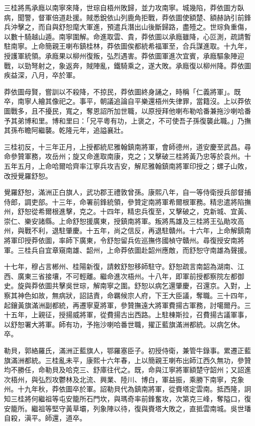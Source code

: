 \begin{pinyinscope}
三桂將馬承廕以南寧來降，世琮自梧州敗歸，並力攻南寧。城幾陷，莽依圖方臥病，聞警，督軍倍道赴援。賊悉銳依山列鹿角拒戰，莽依圖使額楚、額赫訥引前鋒兵沖擊之，而自與舒恕麾大軍進，預遣兵潛出山後斷歸路，盡殪之。世琮負重傷，以數十騎越山遁。南寧圍解。命進取雲、貴，莽依圖以承廕雖降，心叵測，疏請暫駐南寧。上命簡親王喇布鎮桂林，莽依圖俟都統希福軍至，合兵謀進取。十九年，授護軍統領。承廕果以柳州復叛，弘烈遇害。莽依圖軍進次宜賓，承廕驅象陣迎戰，以勁弩射之，象返奔，賊陣亂，鐵騎乘之，遂大敗。承廕復以柳州降。莽依圖疾益深，八月，卒於軍。

莽依圖母賢，嘗訓以不殺降，不掠民，莽依圖終身誦之，時稱「仁義將軍」。既卒，南寧人繪其像祀之。事平，朝議追論自平樂還梧州失律罪，當籍沒。上以莽依圖戰多，且不擾民，寬之，奪恩詔所加世職，以原授拜他喇布勒哈番兼拖沙喇哈番予其弟博和里。博和里曰：「兄平粵有功，上褒之，不可使吾子孫復襲此職。」乃撫其孫布瞻阿繼襲。乾隆元年，追謚襄壯。

三桂初反，十三年正月，上授都統尼雅翰鎮南將軍，會師德州，道安慶至武昌。尋命參贊軍務，攻岳州；旋又命進取南康，克之；又擊破三桂將黃乃忠等於袁州。十五年五月，上命哈爾哈齊率江寧兵攻吉安，解尼雅翰鎮南將軍印授之；螺子山敗，改授覺羅舒恕。

覺羅舒恕，滿洲正白旗人，武功郡王禮敦曾孫。康熙八年，自一等侍衛授兵部督捕侍郎，調吏部。十三年，命署前鋒統領，參贊定南將軍希爾根軍務。精忠遣將陷撫州，舒恕從希爾根進擊，克之。十四年，精忠兵復至，又擊破之，克新城、宜黃、崇仁、樂安諸縣。上命舒恕援廣東，授鎮南將軍。叛將馬雄及三桂將王弘勛攻高州，與戰不利，退駐肇慶。十五年，尚之信反，再退駐贛州。十六年，上命解鎮南將軍印授莽依圖，率師下廣東，令舒恕留兵佐巡撫佟國楨守贛州。尋復授安南將軍。三桂兵自宜章窺南雄、韶州，上命莽依圖赴韶州應敵，而舒恕守南雄為聲援。

十七年，穆占言郴州、桂陽新復，請敕舒恕移師駐守。舒恕疏言南韶為湖南、江西、廣東三省接壤，不可輕離。繼命進次梧州。十八年，即軍前授都察院左都御史。旋與莽依圖共擊吳世琮，解南寧之圍。舒恕以病乞還肇慶，召還京。入對，上察其神色如故，無病狀，詔詰責，命羈候宗人府，下王大臣議，奪職。三十四年，起鑲黃旗滿洲副都統，再遷寧夏將軍，參贊撫遠大將軍費揚古軍務，討噶爾丹。三十五年，上親征，授揚威將軍，從費揚古出西路。上駐棟斯拉，召費揚古議軍事，以舒恕署大將軍。師有功，予拖沙喇哈番世職，擢正藍旗滿洲都統。以病乞休。卒。

勒貝，郭絡羅氏，滿洲正藍旗人，鄂羅塞臣子。初授侍衛，兼管牛錄事。累遷正藍旗滿洲都統。三桂亂未平，康熙十六年春，上以簡親王喇布出師江西久無功，參贊均不勝任，命勒貝及哈克三、舒庫往代之。既，命與江寧將軍額楚守韶州；又詔進次梧州，與弘烈攻鬱林及北流、興業、陸川、博白，軍益振，乘勝下南寧，克象州。十九年秋，莽依圖卒於軍。詔勒貝代為鎮南將軍，從賚塔定雲南。抵西隆，詗知三桂將何繼祖等屯安籠所石門坎，與瑪奇率前鋒奮攻，次第克三峰，奪隘口，復安籠所。繼祖等堅守黃草壩，列象陣以待，復與賚塔大敗之，直抵雲南城。吳世璠自殺，滇平。師還，道卒。


\end{pinyinscope}
